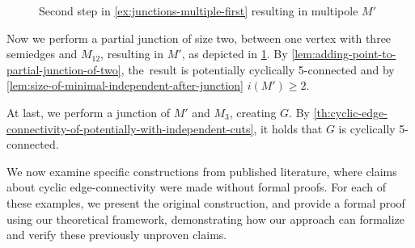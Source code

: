 \documentclass[12pt, twoside]{book}
\begin{document}
\begin{example}
\begin{figure}
		\caption{Second step in \cref{ex:junctions-multiple-first} resulting in multipole $M'$}
		\label{fig:3-5-poles-connected-step-2}
	\end{figure}
	
	Now we perform a partial junction of size two, between one vertex with three semiedges and $M_{12}$, resulting in $M'$, as depicted in \cref{fig:3-5-poles-connected-step-2}. By \cref{lem:adding-point-to-partial-junction-of-two}, the~result is potentially cyclically 5-connected and by \cref{lem:size-of-minimal-independent-after-junction} $i(M')\geq 2$.
	
	At last, we perform a junction of $M'$ and $M_3$, creating $G$. By \cref{th:cyclic-edge-connectivity-of-potentially-with-independent-cuts}, it holds that $G$ is cyclically 5-connected.
\end{example}

We now examine specific constructions from published literature, where claims about cyclic edge-connectivity were made without formal proofs. For each of these examples, we present the original construction, and provide a formal proof using our theoretical framework, demonstrating how our approach can formalize and verify these previously unproven claims.
\end{document}
